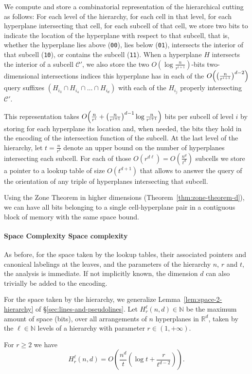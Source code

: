 We compute and store a combinatorial representation of the hierarchical cutting
as follows: For each level of the hierarchy, for each cell in that level, for
each hyperplane intersecting that cell, for each subcell of that cell, we store
two bits to indicate the location of the hyperplane with respect to that
subcell\ifeurocg\else, that is, whether the hyperplane lies above
(\texttt{00}), lies below (\texttt{01}), intersects the interior of that
subcell (\texttt{10}), or contains the subcell (\texttt{11})\fi.
%
When a hyperplane \(H\) intersects the interior of a subcell \(\mathcal{C}'\),
we also store the two \(O(\log \frac{n}{r^{i+1}})\)-bits two-dimensional
intersections indices this hyperplane has in each of the
\(O\mleft({\left(\frac{n}{r^{i+1}}\right)}^{d-2}\mright)\)
query suffixes \((H_{i_3} \cap H_{i_4} \cap \ldots \cap H_{i_d})\) with each of the
\(H_{i_j}\) properly intersecting \(\mathcal{C}'\).

This representation takes
\(O\mleft(
  \frac{n}{r^i}
  +
  {\left(\frac{n}{r^{i+1}}\right)}^{d-1} \log{\frac{n}{r^{i+1}}}
\mright)\)
bits per subcell of level \(i\) by storing for each
hyperplane its location and, when needed, the bits they hold in
the encoding of the intersection function of the subcell.
At the last level of the hierarchy, let \(t =
\frac{n}{r^\ell}\) denote an upper bound on the number of hyperplanes
intersecting each subcell. For each of those \(O(r^{d \ell}) =
O(\frac{n^d}{t^d})\) subcells we store a pointer to a lookup table of size
\(O(t^{d+1})\) that allows to answer the query of the orientation of any
triple of hyperplanes intersecting that subcell.

Using the Zone Theorem in higher dimensions (Theorem~\ref{thm:zone-theorem-d}),
we can have all bits belonging to a single cell-hyperplane pair in a contiguous
block of memory with the same space bound.

\paragraph*{\iftitlecase%
Space Complexity\else%
Space complexity\fi}
As before, for the space taken by the lookup tables, their
associated pointers and canonical labelings at the leaves, and the parameters
of the hierarchy \(n\), \(r\) and \(t\), the analysis is immediate. If not
implicitly known, the dimension \(d\) can also trivially be added to the
encoding.

For the space taken by the hierarchy,
we generalize Lemma~\ref{lem:space-2-hierarchy} of
\S\ref{sec:lines-and-pseudolines}. Let \(H_r^\ell(n,d) \in \mathbb{N}\) be the maximum
amount of space (bits), over all arrangements of \(n\) hyperplanes in \(\mathbb{R}^d\),
taken by the \(\ell \in \mathbb{N}\) levels of a hierarchy with parameter \(r \in
(1,+\infty)\).
%
\begin{lemma}\label{lem:space-d-hierarchy}
For \( r \geq 2 \) we have
\begin{displaymath}
H_r^\ell(n,d)
=
O\left(\frac{n^d}{t} \left(\log t + \frac{r}{t^{d-2}}\right)\right).
\end{displaymath}
\end{lemma}

